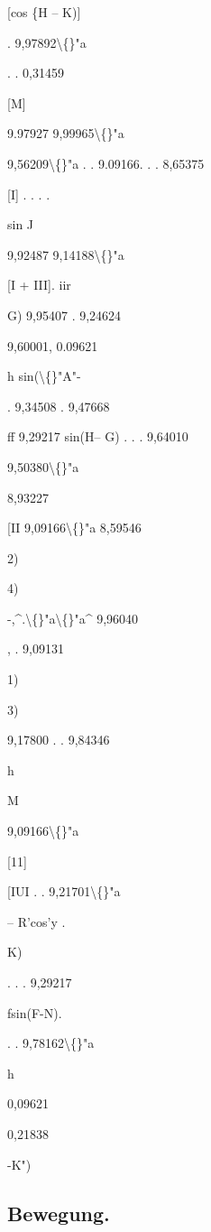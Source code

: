 \documentclass[10pt,a4paper]{article}
\begin{document}
[cos \{H -- K)]

. 9,97892\textbackslash\{\}"a

. . 0,31459

[M]

9.97927
9,99965\textbackslash\{\}"a

9,56209\textbackslash\{\}"a
. . 9.09166.
. . 8,65375

[I] . . . .

sin J

9,92487
9,14188\textbackslash\{\}"a

[I + III].
iir

G) 9,95407
. 9,24624

9,60001,
0.09621

h
sin(\textbackslash\{\}"A"-

. 9,34508
. 9,47668

ff
9,29217
sin(H-- G) . . . 9,64010

9,50380\textbackslash\{\}"a

8,93227

[II
9,09166\textbackslash\{\}"a
8,59546

2)

4)

-,\textasciicircum{}.\textbackslash\{\}"a\textbackslash\{\}"a\textasciicircum{}
9,96040

, . 9,09131

1)

3)

9,17800
. . 9,84346

h

M

9,09166\textbackslash\{\}"a

[11]

[IUI . .
9,21701\textbackslash\{\}"a

-- R'cos'y .

K)

. . . 9,29217

fsin(F-N).

. . 9,78162\textbackslash\{\}"a

h

0,09621

0,21838

-K")


\subsection*{Bewegung.}
\end{document}
